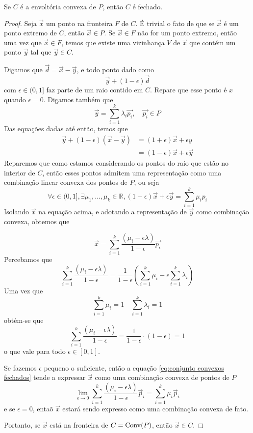 \begin{prop:conjuntos convexos fechados}
Se $C$ é a envoltória convexa de $P$, então $C$ é fechado.

  \begin{proof}
   Seja $\vec{x}$ um ponto na fronteira $F$ de $C$. É trivial o fato de que se
   $\vec{x}$ é um ponto extremo de $C$, então $\vec{x} \in P$. Se
   $\vec{x} \in F$ não for um ponto extremo, então uma vez que $\vec{x} \in F$,
   temos que existe uma vizinhança $V$ de $\vec{x}$ que contém um ponto $\vec{y}$
   tal que $\vec{y} \in C$.

   Digamos que $\vec{d} = \vec{x} - \vec{y}$, e todo ponto dado como \[
     \vec{y} + (1 - \epsilon) \vec{d}
   \]com $\epsilon \in (0, 1]$ faz parte de um raio contido em $C$. Repare que
   esse ponto é $x$ quando $\epsilon = 0$. Digamos também que \[
     \vec{y} = \sum_{i=1}^{k} \lambda_i \vec{p_i}, \quad \vec{p_i}  \in P
   \]Das equações dadas até então, temos que
   \begin{align*}
     \vec{y} + (1 - \epsilon) (\vec{x} - \vec{y}) &= (1 + \epsilon) \vec{x}
     + \epsilon y \\
                                                  &= (1 - \epsilon) \vec{x} + \epsilon \vec{y}
   \end{align*}
   Reparemos que como estamos considerando os pontos do raio que estão no
   interior de $C$, então esses pontos
   admitem uma representação como uma combinação linear convexa dos pontos de
   $P$, ou seja
   \[
     \forall \epsilon \in (0, 1] , \exists \mu_1, \dots, \mu_k \in \mathbb{R},
     (1-\epsilon)\vec{x} + \epsilon \vec{y} = \sum_{i=1}^{k} \mu_i p_i
   \]
   Isolando $\vec{x}$ na equação acima, e adotando a representação de $\vec{y}$
   como combinação convexa, obtemos que

   \begin{equation}
     \label{eq:conjunto convexos fechados}
     \vec{x} = \sum_{i=1}^{k} \frac{(\mu_i  - \epsilon \lambda)}{1-\epsilon} \vec{p_i}
   \end{equation}
   Percebamos que
   \[
    \sum_{i=1}^{k} \frac{(\mu_i  - \epsilon \lambda)}{1-\epsilon} =
    \frac{1}{1-\epsilon}\left(
      \sum_{i=1}^{k} \mu_i -   \epsilon \sum_{i=1}^{k} \lambda_i\right)
   \]
   Uma vez que
   \[
    \sum_{i=1}^{k} \mu_i = 1 \quad \sum_{i=1}^{k} \lambda_i = 1
   \]
   obtém-se que
   \[
   \sum_{i=1}^{k} \frac{(\mu_i  - \epsilon \lambda)}{1-\epsilon} =
   \frac{1}{1-\epsilon} \cdot (1 - \epsilon) = 1
   \]
   o que vale para todo $\epsilon \in [0, 1]$.

   Se fazemos $\epsilon$ pequeno o suficiente, então a equação
   \ref{eq:conjunto convexos fechados} tende a expressar $\vec{x}$ como uma
   combinação convexa de pontos de $P$
   \[
     \lim_{\epsilon \to 0} \sum_{i=1}^{k} \frac{(\mu_i  - \epsilon \lambda)}{1-\epsilon} \vec{p}_i
     = \sum_{i=1}^{k} \mu_i \vec{p}_i
   \]
   e se $\epsilon = 0$, entaõ $\vec{x}$ estará sendo expresso como uma
   combinação convexa de fato.

   Portanto, se $\vec{x}$ está na fronteira de $C = \mathrm{Conv}(P)$, então
   $\vec{x} \in C$.
 \end{proof}
\end{prop:conjuntos convexos fechados}

